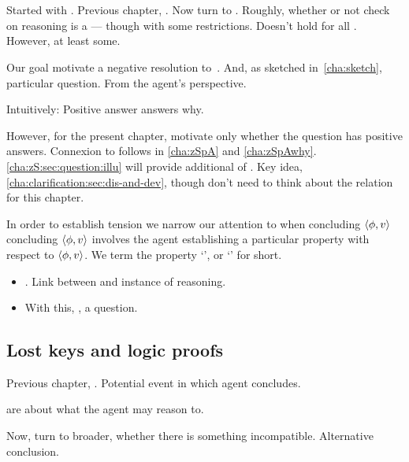 \chapter{}
\label{cha:zS}

\begin{note}
  Started with .
  Previous chapter, .
  Now turn to \zSN{}.
  {
    \color{red}
    Roughly, whether or not check on reasoning is a  --- though with some restrictions.
    Doesn't hold for all .
    However, at least some.
  }

  Our goal motivate a negative resolution to~\issueConstraint{}.
  And, as sketched in~\autoref{cha:sketch}, \zSN{} particular question.
  From the agent's perspective.

  Intuitively:
  Positive answer answers why.

  However, for the present chapter, motivate only whether the question has positive answers.
  Connexion to \qWhyV{} follows in \autoref{cha:zSpA} and \autoref{cha:zSpAwhy}.
  \autoref{cha:zS:sec:question:illu} will provide additional  of \zS{}.
  Key idea, \autoref{cha:clarification:sec:dis-and-dev}, though don't need to think about the relation for this chapter.
\end{note}

\begin{note}
  In order to establish tension we narrow our attention to when concluding \(\langle \phi, v \rangle\) concluding \(\langle \phi, v \rangle\) involves the agent establishing a particular property with respect to \(\langle \phi, v \rangle\).
  We term the property `', or `\zS{}' for short.
\end{note}

\begin{note}
  \begin{itemize}
  \item
    .
    Link between  and instance of reasoning.
  \item
    With this, \qzS{}, a question.
  \end{itemize}
\end{note}

\section{Lost keys and logic proofs}
\label{sec:lost-keys}

\begin{note}
  Previous chapter, .
  Potential event in which agent concludes.

   are about what the agent may reason to.

  Now, turn to broader, whether there is something incompatible.
  Alternative conclusion.
\end{note}

